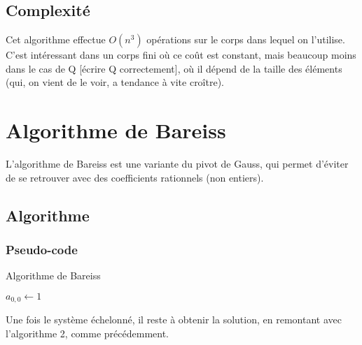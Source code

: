 \documentclass[french]{article}
\begin{document}
\subsection{Complexité}
Cet algorithme effectue $O(n^3)$ opérations sur le corps dans lequel on l'utilise. C'est intéressant dans un corps fini où ce coût est constant, mais beaucoup moins dans le cas de Q [écrire Q correctement], où il dépend de la taille des éléments (qui, on vient de le voir, a tendance à vite croître).
\section{Algorithme de Bareiss}
L'algorithme de Bareiss est une variante du pivot de Gauss, qui permet d'éviter de se retrouver avec des coefficients rationnels (non entiers). 
\subsection{Algorithme}
\subsubsection{Pseudo-code}
\begin{algorithm}[H]
	\DontPrintSemicolon
	\caption{Algorithme de Bareiss}
	$a_{0,0} \gets 1$
\end{algorithm}
\leavevmode \newline
Une fois le système échelonné, il reste à obtenir la solution, en remontant avec l'algorithme 2, comme précédemment.
\end{document}
